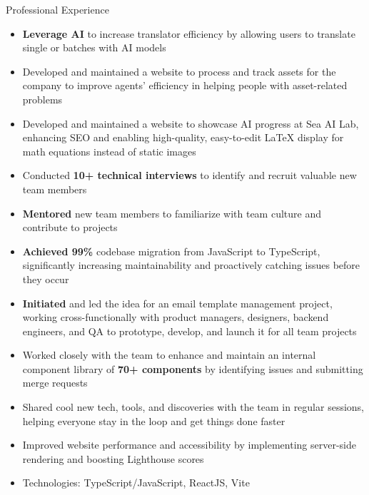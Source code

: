 \documentclass{resume}
\begin{document}
\begin{experienceSection}{Professional Experience}
    \experienceItem[
        company={Sea Limited},
        location={Singapore},
        position={Senior Frontend Engineer},
        duration={Jan 2024 – Present}
    ]
    \begin{itemize}
        \itemsep -6pt {}
        \item \textbf{Leverage AI} to increase translator efficiency by allowing users to translate single or batches with AI models
        \item Developed and maintained a website to process and track assets for the company to improve agents' efficiency in helping people with asset-related problems
        \item Developed and maintained a website to showcase AI progress at Sea AI Lab, enhancing SEO and enabling high-quality, easy-to-edit LaTeX display for math equations instead of static images
        \item Conducted \textbf{10+ technical interviews} to identify and recruit valuable new team members
        \item \textbf{Mentored} new team members to familiarize with team culture and contribute to projects
    \end{itemize}

    \experienceItem[
        company={Sea Limited},
        location={Singapore},
        position={Frontend Engineer},
        duration={Aug 2021 – Dec 2023}
    ]
    \begin{itemize}
        \itemsep -6pt {}
        \item \textbf{Achieved 99\%} codebase migration from JavaScript to TypeScript, significantly increasing maintainability and proactively catching issues before they occur
        \item \textbf{Initiated} and led the idea for an email template management project, working cross-functionally with product managers, designers, backend engineers, and QA to prototype, develop, and launch it for all team projects
        \item Worked closely with the team to enhance and maintain an internal component library of \textbf{70+ components} by identifying issues and submitting merge requests
        \item Shared cool new tech, tools, and discoveries with the team in regular sessions, helping everyone stay in the loop and get things done faster
        \item Improved website performance and accessibility by implementing server-side rendering and boosting Lighthouse scores
        \item Technologies: TypeScript/JavaScript, ReactJS, Vite
    \end{itemize}


\end{experienceSection}
\end{document}

